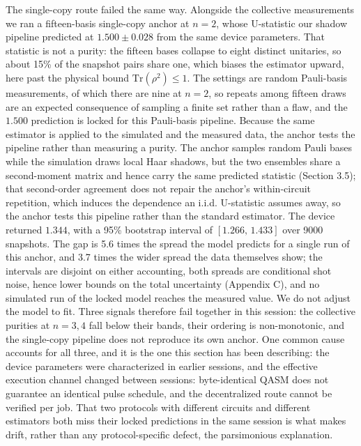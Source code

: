 The single-copy route failed the same way. Alongside the collective
measurements we ran a fifteen-basis single-copy anchor at \(n = 2\),
whose U-statistic our shadow pipeline predicted at \(1.500 \pm 0.028\)
from the same device parameters. That statistic is not a purity: the
fifteen bases collapse to eight distinct unitaries, so about 15\% of the
snapshot pairs share one, which biases the estimator upward, here
past the physical bound \(\mathrm{Tr}(\rho^2) \leq 1\). The settings are
random Pauli-basis measurements, of which there are nine at \(n = 2\), so
repeats among fifteen draws are an expected consequence of sampling a
finite set rather than a flaw, and the \(1.500\) prediction is locked for
this Pauli-basis pipeline. Because the same estimator is
applied to the simulated and the measured data, the anchor tests the
pipeline rather than measuring a purity. The anchor samples random Pauli
bases while the simulation draws local Haar shadows, but the two
ensembles share a second-moment matrix and hence carry the same predicted
statistic (Section 3.5); that second-order agreement
does not repair the anchor's within-circuit repetition, which induces the
dependence an i.i.d. U-statistic assumes away, so the anchor tests this
pipeline rather than the standard estimator. The device returned
\(1.344\), with a 95\%
bootstrap interval of \([1.266,\, 1.433]\) over 9000 snapshots. The gap is
5.6 times the spread the model predicts for a single run of this anchor,
and 3.7 times the wider spread the data themselves show; the intervals are
disjoint on either accounting, both spreads are conditional shot noise,
hence lower bounds on the total uncertainty (Appendix C), and no
simulated run of the locked model
reaches the measured value. We do not
adjust the model to fit. Three signals therefore fail together in this
session: the collective purities at \(n = 3, 4\) fall below their bands,
their ordering is non-monotonic, and the single-copy pipeline does not
reproduce its own anchor. One common cause accounts for all three, and
it is the one this section has been describing: the device parameters were characterized in earlier sessions, and the effective execution channel changed between sessions: byte-identical QASM does not guarantee an identical pulse schedule, and the decentralized route cannot be verified per job.
That two protocols with different circuits and different estimators both
miss their locked predictions in the same session is what makes drift,
rather than any protocol-specific defect, the parsimonious explanation.

